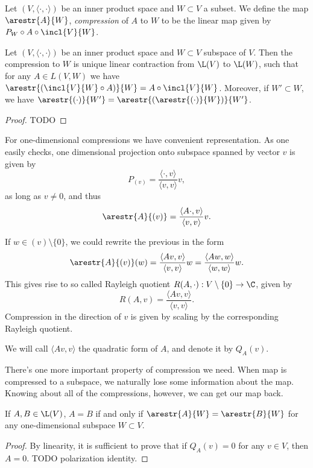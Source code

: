 \begin{maar}
	Let $(V, \langle \cdot, \cdot \rangle )$ be an inner product space and $W \subset V$ a subset. We define the map $\arestr{A}{W}$, \textit{compression} of $A$ to $W$ to be the linear map given by $P_{W} \circ A \circ \incl{V}{W}$.
\end{maar}

\begin{lause}
	Let $(V, \langle \cdot, \cdot \rangle)$ be an inner product space and $W \subset V$ subspace of $V$. Then the compression to $W$ is unique linear contraction from $\L(V)$ to $\L(W)$, such that for any $A \in L(V, W)$ we have $\arestr{(\incl{V}{W} \circ A)}{W} = A \circ \incl{V}{W}$. Moreover, if $W' \subset W$, we have $\arestr{(\cdot)}{W'} = \arestr{(\arestr{(\cdot)}{W})}{W'}$.
\end{lause}
\begin{proof}
	TODO
\end{proof}

For one-dimensional compressions we have convenient representation. As one easily checks, one dimensional projection onto subspace spanned by vector $v$ is given by
\[
	P_{(v)} = \frac{\langle \cdot, v \rangle}{\langle v, v \rangle} v,
\]
as long as $v \neq 0$, and thus
\[
	\arestr{A}{(v)} = \frac{\langle A \cdot, v \rangle}{\langle v, v \rangle} v.
\]

If $w \in (v) \setminus \{0\}$, we could rewrite the previous in the form
\[
	\arestr{A}{(v)}(w) = \frac{\langle A v, v\rangle}{\langle v, v\rangle} w = \frac{\langle A w, w\rangle}{\langle w, w \rangle} w.
\]
This gives rise to so called Rayleigh quotient $R(A, \cdot) : V \setminus \{0\} \to \C$, given by
\[
	R(A, v) = \frac{\langle A v, v \rangle}{\langle v, v \rangle}.
\]
Compression in the direction of $v$ is given by scaling by the corresponding Rayleigh quotient.

We will call $\langle A v, v \rangle$ the quadratic form of $A$, and denote it by $Q_{A}(v)$.

There's one more important property of compression we need. When map is compressed to a subspace, we naturally lose some information about the map. Knowing about all of the compressions, however, we can get our map back.

\begin{lem}
	If $A, B \in \L(V)$, $A = B$ if and only if $\arestr{A}{W} = \arestr{B}{W}$ for any one-dimensional subspace $W \subset V$.
\end{lem} 
\begin{proof}
	By linearity, it is sufficient to prove that if $Q_{A}(v) = 0$ for any $v \in V$, then $A = 0$. TODO polarization identity.
\end{proof}

